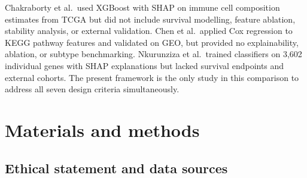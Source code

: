 \documentclass[review,12pt]{elsarticle}
\begin{document}
\begin{table}[!ht]
\centering
\caption{Comparison with related breast cancer prediction approaches.
         Columns: Feat.~= feature type; Surv.~= survival analysis;
         XAI = explainability; Abl.~= ablation; Stab.~= stability;
         Sub.~= subtype baseline; Ext.~= external validation.}
\label{tab:comparison}
\end{table}

Chakraborty et al.\ used XGBoost with SHAP on immune cell composition
estimates from TCGA but did not include survival modelling, feature
ablation, stability analysis, or external validation.
Chen et al.\ applied Cox regression to KEGG pathway features and
validated on GEO, but provided no explainability, ablation, or subtype
benchmarking.  Nkurunziza et al.\ trained classifiers on 3,602 individual
genes with SHAP explanations but lacked survival endpoints and external
cohorts.  The present framework is the only study in this comparison to
address all seven design criteria simultaneously.

\section{Materials and methods}
\label{sec:methods}

\subsection{Ethical statement and data sources}
\label{sec:data}
\end{document}

